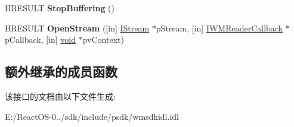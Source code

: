 \begin{DoxyCompactItemize}
\mbox{\label{interface_i_w_m_reader_advanced2_a6fc73ab5c09bd1859aaa8b7119e02ef1}} 
H\+R\+E\+S\+U\+LT {\bfseries Stop\+Buffering} ()
\item 
\mbox{\label{interface_i_w_m_reader_advanced2_aba23337a4147e20a653eb7cb91d4fa6b}} 
H\+R\+E\+S\+U\+LT {\bfseries Open\+Stream} (\mbox{[}in\mbox{]} \hyperlink{interface_i_stream}{I\+Stream} $\ast$p\+Stream, \mbox{[}in\mbox{]} \hyperlink{interface_i_w_m_reader_callback}{I\+W\+M\+Reader\+Callback} $\ast$p\+Callback, \mbox{[}in\mbox{]} \hyperlink{interfacevoid}{void} $\ast$pv\+Context)
\end{DoxyCompactItemize}
\subsection*{额外继承的成员函数}


该接口的文档由以下文件生成\+:\begin{DoxyCompactItemize}
\item 
E\+:/\+React\+O\+S-\/0../sdk/include/psdk/wmsdkidl.\+idl\end{DoxyCompactItemize}
